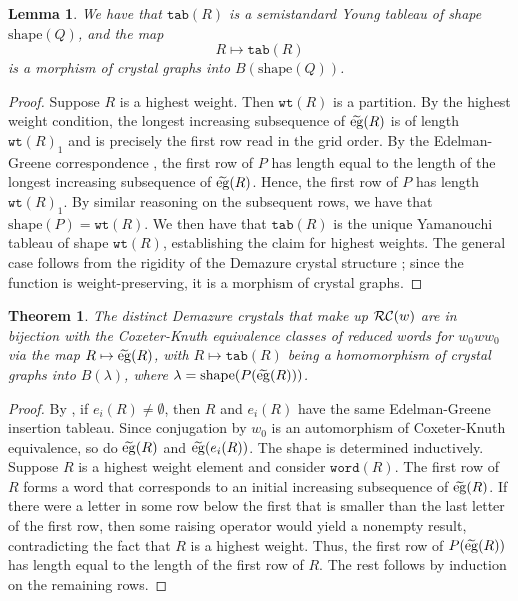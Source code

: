 \documentclass{amsart}
\newtheorem{lemma}{Lemma}[subsection]
\newtheorem{theorem}{Theorem}[section]
\theoremstyle{definition}
\theoremstyle{remark}
\numberwithin{equation}{subsection}
\newcommand{\wtt}{\mathtt{wt}}
\begin{document}
\begin{lemma}
	We have that $\mathtt{tab}(R)$ is a semistandard Young tableau of shape $\mathrm{shape}(Q)$, and the map
	$$R\mapsto \mathtt{tab}(R)$$
	 is a morphism of crystal graphs into $B(\mathrm{shape}(Q))$. 
\end{lemma}
\begin{proof}
Suppose $R$ is a highest weight. Then $\wtt(R)$ is a partition. By the highest weight condition, the longest increasing subsequence of $\widetilde{\mathrm{eg}}(R)$ is of length $\wtt(R)_1$ and is precisely the first row read in the grid order. By the Edelman-Greene correspondence \cite{edelman1987balanced}, the first row of $P$ has length equal to the length of the longest increasing subsequence of $\widetilde{\mathrm{eg}}(R)$. Hence, the first row of $P$ has length $\wtt(R)_1$. By similar reasoning on the subsequent rows, we have that $\mathrm{shape}(P) = \wtt(R)$. We then have that $\mathtt{tab}(R)$ is the unique Yamanouchi tableau of shape $\wtt(R)$, establishing the claim for highest weights. The general case follows from the rigidity of the Demazure crystal structure \cite{assaf2018demazure}; since the function is weight-preserving, it is a morphism of crystal graphs.
\end{proof}

\begin{theorem}
  The distinct Demazure crystals that make up $\mathcal{RC}(w)$ are in bijection with the Coxeter-Knuth equivalence classes of reduced words for $w_0ww_0$ via the map $R\mapsto \widetilde{\mathrm{eg}}(R)$, with $R\mapsto \mathtt{tab}(R)$ being a homomorphism of crystal graphs into $B(\lambda)$, where $\lambda=\mathrm{shape}(P(\widetilde{\mathrm{eg}}(R)))$.
\end{theorem}
\begin{proof}
By \cite[Theorem~4.11]{morse2016crystal}, if $e_i(R)\neq \emptyset$, then $R$ and $e_i(R)$ have the same Edelman-Greene insertion tableau. Since conjugation by $w_0$ is an automorphism of Coxeter-Knuth equivalence, so do $\widetilde{\mathrm{eg}}(R)$ and $\widetilde{\mathrm{eg}}(e_i(R))$. The shape is determined inductively. Suppose $R$ is a highest weight element and consider $\mathtt{word}(R)$. The first row of $R$ forms a word that corresponds to an initial increasing subsequence of $\widetilde{\mathrm{eg}}(R)$. If there were a letter in some row below the first that is smaller than the last letter of the first row, then some raising operator would yield a nonempty result, contradicting the fact that $R$ is a highest weight. Thus, the first row of $P(\widetilde{\mathrm{eg}}(R))$ has length equal to the length of the first row of $R$. The rest follows by induction on the remaining rows.
\end{proof}
\end{document}
